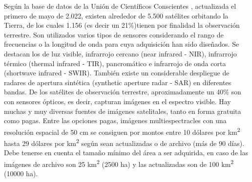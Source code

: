 Según la base de datos de la Unión de Científicos Conscientes \cite{noauthor_satellite_nodate}, actualizada el primero de mayo de 2.022, existen alrededor de 5.500 satélites orbitando la Tierra, de los cuales 1.156 (es decir un 21\%)tienen por finalidad la observación terrestre. Son utilizados varios tipos de sensores considerando el rango de frecuencias o la longitud de onda para cuya adquisición han sido diseñados. Se destacan los de luz visible, infrarrojo cercano (near infrared - NIR), infrarrojo térmico (thermal infrared - TIR), pancromático e infrarrojo de onda corta (shortwave infrared - SWIR). También existe un considerable despliegue de radares de apertura sintética (synthetic aperture radar - SAR) en diferentes bandas. De los satélites de observación terrestre, aproximadamente un 40\% son con sensores ópticos, es decir, capturan imágenes en el espectro visible.
Hay muchas y muy diversas fuentes de imágenes satelitales, tanto en forma gratuita como pagas. Entre las opciones pagas, imágenes multiespectracles con una resolución espacial de 50 cm se consiguen por montos entre 10 dólares por km\textsuperscript{2} hasta 29 dólares por km\textsuperscript{2} según sean actualizadas o de archivo (más de 90 días)\cite{noauthor_satellite_2020}. Debe tenerse en cuenta el tamaño mínimo del área a ser adquirida, en caso de las imágenes de archivo son 25 km\textsuperscript{2} (2500 ha) y las actualizadas son de 100 km\textsuperscript{2} (10000 ha).
